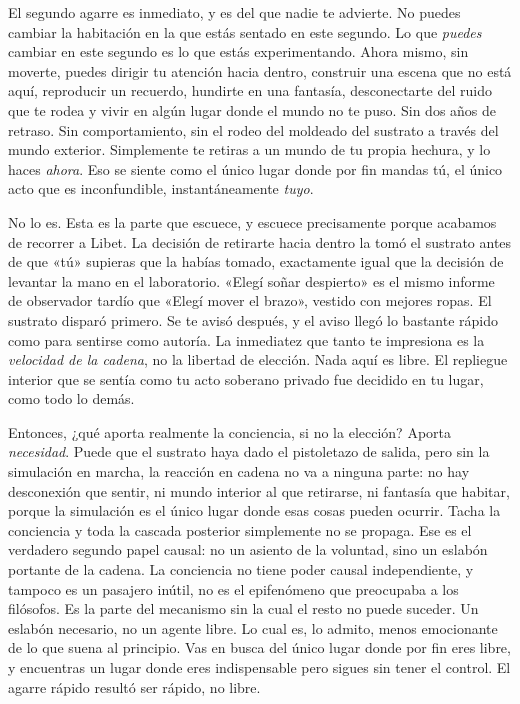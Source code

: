 \documentclass[11pt, twoside, openright]{book}
\begin{document}
El segundo agarre es inmediato, y es del que nadie te advierte. No puedes cambiar la habitación en la que estás sentado en este segundo. Lo que \textit{puedes} cambiar en este segundo es lo que estás experimentando. Ahora mismo, sin moverte, puedes dirigir tu atención hacia dentro, construir una escena que no está aquí, reproducir un recuerdo, hundirte en una fantasía, desconectarte del ruido que te rodea y vivir en algún lugar donde el mundo no te puso. Sin dos años de retraso. Sin comportamiento, sin el rodeo del moldeado del sustrato a través del mundo exterior. Simplemente te retiras a un mundo de tu propia hechura, y lo haces \textit{ahora}. Eso se siente como el único lugar donde por fin mandas tú, el único acto que es inconfundible, instantáneamente \textit{tuyo}.

No lo es. Esta es la parte que escuece, y escuece precisamente porque acabamos de recorrer a Libet. La decisión de retirarte hacia dentro la tomó el sustrato antes de que «tú» supieras que la habías tomado, exactamente igual que la decisión de levantar la mano en el laboratorio. «Elegí soñar despierto» es el mismo informe de observador tardío que «Elegí mover el brazo», vestido con mejores ropas. El sustrato disparó primero. Se te avisó después, y el aviso llegó lo bastante rápido como para sentirse como autoría. La inmediatez que tanto te impresiona es la \textit{velocidad de la cadena}, no la libertad de elección. Nada aquí es libre. El repliegue interior que se sentía como tu acto soberano privado fue decidido en tu lugar, como todo lo demás.

Entonces, ¿qué aporta realmente la conciencia, si no la elección? Aporta \textit{necesidad}. Puede que el sustrato haya dado el pistoletazo de salida, pero sin la simulación en marcha, la reacción en cadena no va a ninguna parte: no hay desconexión que sentir, ni mundo interior al que retirarse, ni fantasía que habitar, porque la simulación es el único lugar donde esas cosas pueden ocurrir. Tacha la conciencia y toda la cascada posterior simplemente no se propaga. Ese es el verdadero segundo papel causal: no un asiento de la voluntad, sino un eslabón portante de la cadena. La conciencia no tiene poder causal independiente, y tampoco es un pasajero inútil, no es el epifenómeno que preocupaba a los filósofos. Es la parte del mecanismo sin la cual el resto no puede suceder. Un eslabón necesario, no un agente libre. Lo cual es, lo admito, menos emocionante de lo que suena al principio. Vas en busca del único lugar donde por fin eres libre, y encuentras un lugar donde eres indispensable pero sigues sin tener el control. El agarre rápido resultó ser rápido, no libre.
\end{document}
